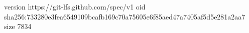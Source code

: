 version https://git-lfs.github.com/spec/v1
oid sha256:733280e3fea6549109bcafb169c70a75605e6f85aed47a7405af5d5e281a2aa7
size 7834
